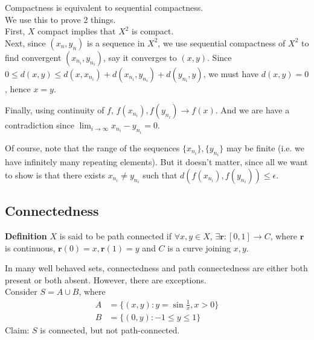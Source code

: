 \documentclass{article}
\begin{document}
Compactness is equivalent to sequential compactness.\\
We use this to prove 2 things.\\
First, $X$ compact implies that $X^2$ is compact.\\
Next, since $(x_n,y_n)$ is a sequence in $X^2$, we use sequential compactness of $X^2$ to find convergent $(x_{n_i},y_{n_i})$, say it converges to $(x,y)$. Since $0\leq d(x,y)\leq d(x,x_{n_i}) + d(x_{n_i}, y_{n_i}) + d(y_{n_i},y)$, we must have $d(x,y)=0$, hence $x=y$.

Finally, using continuity of $f$, $f(x_{n_i}), f(y_{n_i})\rightarrow f(x)$. And we are have a contradiction since $\lim_{i\rightarrow \infty}x_{n_i}-y_{n_i}=0$. 

Of course, note that the range of the sequences $\{x_{n_i}\}, \{y_{n_i}\}$ may be finite (i.e. we have infinitely many repeating elements). But it doesn't matter, since all we want to show is that there exists $x_{n_i}\neq y_{n_i}$ such that $d(f(x_{n_i}),f(y_{n_i}))\leq \epsilon$.

\subsection{Connectedness}
\textbf{Definition} $X$ is said to be path connected if $\forall x,y\in X$, $\exists \mathbf{r}:[0,1]\rightarrow C$, where $\mathbf{r}$ is continuous, $\mathbf{r}(0)=x,\mathbf{r}(1)=y$ and $C$ is a curve joining $x,y$.

In many well behaved sets, connectedness and path connectedness are either both present or both absent. However, there are exceptions.\\
Consider $S=A\cup B$, where
\begin{align*}
	A &= \{(x,y):y=\sin \frac{1}{x}, x>0\}\\
	B &= \{(0,y):-1\leq y\leq 1\}
\end{align*}
Claim: $S$ is connected, but not path-connected.
\end{document}
